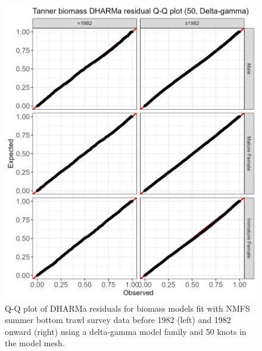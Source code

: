 \documentclass[
]{article}
\begin{document}
\begin{figure}

{\centering \includegraphics[width=6in]{../BAIRDI/Figures/DHARMa_biomass_50-Delta-gamma_QQplot} 

}

\caption{Q-Q plot of DHARMa residuals for biomass models fit with NMFS summer bottom trawl survey data before 1982 (left) and 1982 onward (right) using a delta-gamma model family and 50 knots in the model mesh.}\label{fig:DHARMa-bio-QQ-50}
\end{figure}
\end{document}

